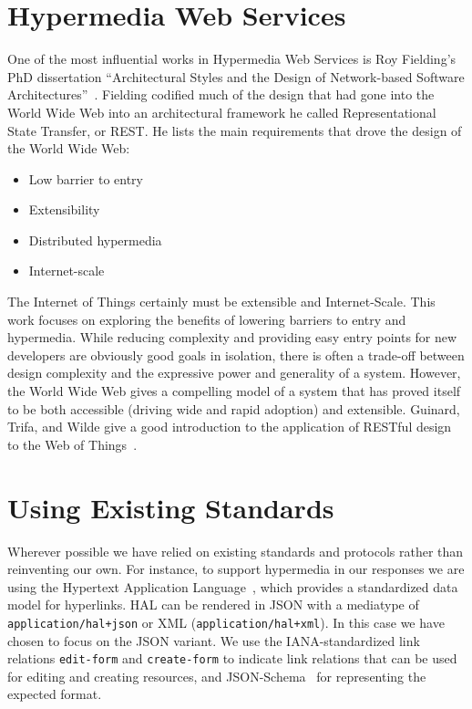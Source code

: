 \documentclass{acm_proc_article-sp}
\newenvironment{tightitemize}{
    \vspace{-10pt}
    \begin{itemize}
        \setlength{\parskip}{-1pt}}{
    \end{itemize}
    \vspace{-10pt}}
\begin{document}
\section{Hypermedia Web Services}

One of the most influential works in Hypermedia Web Services is Roy Fielding's
PhD dissertation ``Architectural Styles and the Design of Network-based
Software Architectures''~\cite{fielding}. Fielding codified much of the design
that had gone into the World Wide Web into an architectural framework he called
Representational State Transfer, or REST. He lists the main requirements that
drove the design of the World Wide Web:

\begin{tightitemize}
    \item Low barrier to entry
    \item Extensibility
    \item Distributed hypermedia
    \item Internet-scale
\end{tightitemize}

The Internet of Things certainly must be extensible and Internet-Scale. This
work focuses on exploring the benefits of lowering barriers to entry and
hypermedia. While reducing complexity and providing easy entry points for new
developers are obviously good goals in isolation, there is often a trade-off
between design complexity and the expressive power and generality of a system.
However, the World Wide Web gives a compelling model of a system that has
proved itself to be both accessible (driving wide and rapid adoption) and
extensible. Guinard, Trifa, and Wilde give a good introduction to the
application of RESTful design to the Web of Things~\cite{guinard2010}.

\section{Using Existing Standards}

Wherever possible we have relied on existing standards and protocols rather
than reinventing our own. For instance, to support hypermedia in our responses
we are using the Hypertext Application Language~\cite{json-hal-draft}, which
provides a standardized data model for hyperlinks. HAL can be rendered in JSON
with a mediatype of \texttt{application/hal+json} or XML
(\texttt{application/hal+xml}). In this case we have chosen to focus on the JSON
variant. We use the IANA-standardized link relations \texttt{edit-form} and
\texttt{create-form} to indicate link relations that can be used for editing
and creating resources, and JSON-Schema~\cite{json-schema-draft} for
representing the expected format.
\end{document}
